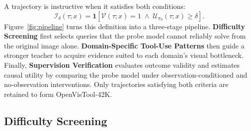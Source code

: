 A trajectory is instructive when it satisfies both conditions:
\begin{equation}
\mathcal{I}_{\delta}(\tau;x)=\mathbf{1}\left[\mathcal{V}(\tau;x)=1\;\land\;\mathcal{U}_{\pi_0}(\tau;x)\geq\delta\right].
\label{eq:instructive-criterion}
\end{equation}
Figure~\ref{fig:pipeline} turns this definition into a three-stage pipeline. 
\textbf{Difficulty Screening} first selects queries that the probe model cannot reliably solve from the original image alone.
\textbf{Domain-Specific Tool-Use Patterns} then guide a stronger teacher to acquire evidence suited to each domain's visual bottleneck. 
Finally, \textbf{Supervision Verification} evaluates outcome validity and estimates causal utility by comparing the probe model under observation-conditioned and no-observation interventions. 
Only trajectories satisfying both criteria are retained to form OpenVisTool-42K.


\subsection{Difficulty Screening}
\label{sec:data}


